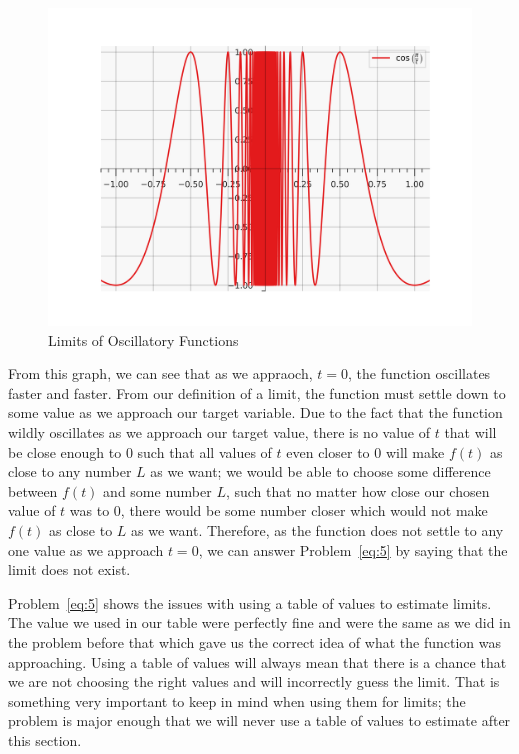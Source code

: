 \documentclass[12pt]{article}
\theoremstyle{definition}
\begin{document}
\begin{figure}[H]
    \centering
    \includegraphics[width=12.5cm, keepaspectratio]{limits_3.png}
    \caption{Limits of Oscillatory Functions}
    \label{fig:fig3}
\end{figure}

From this graph, we can see that as we appraoch, $t=0$, the function oscillates faster and faster.
From our definition of a limit, the function must settle down to some value as we approach our target variable.
Due to the fact that the function wildly oscillates as we approach our target value, there is no value of $t$ that will be close enough to 0 such that all values of $t$ even closer to 0 will make $f(t)$ as close to any number $L$ as we want; we would be able to choose some difference between $f(t)$ and some number $L$, such that no matter how close our chosen value of $t$ was to 0, there would be some number closer which would not make $f(t)$ as close to $L$ as we want.
Therefore, as the function does not settle to any one value as we approach $t=0$, we can answer Problem~\eqref{eq:5} by saying that the limit does not exist.

Problem~\eqref{eq:5} shows the issues with using a table of values to estimate limits.
The value we used in our table were perfectly fine and were the same as we did in the problem before that which gave us the correct idea of what the function was approaching.
Using a table of values will always mean that there is a chance that we are not choosing the right values and will incorrectly guess the limit.
That is something very important to keep in mind when using them for limits; the problem is major enough that we will never use a table of values to estimate after this section.
\end{document}
